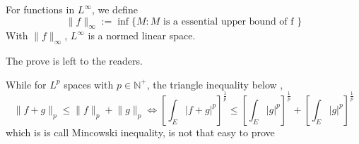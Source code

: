 \documentclass[lang=en, 12pt]{elegantbook}
\newcommand{\NN}{\mathbb{N}}
\begin{document}
        \begin{proposition}
            For functions in $L^{\infty}$, we define 
            \begin{equation}\label{NormOfLInftySpace}
                \lVert f \rVert_{\infty} := \inf \{M : M \mbox{ is a essential upper bound of f } \}
            \end{equation}
            With $\lVert f \rVert_{\infty}$, $L^{\infty}$ is a normed linear space.
        \end{proposition}
        The prove is left to the readers. \par While for $L^p$ spaces with $p \in \NN^+$,
    the triangle inequality below ,
    $$\lVert f + g \rVert_p \leq \lVert f \rVert_p +\lVert g \rVert_p
    \Leftrightarrow \left[\int_E |f +g|^p \right]^{\frac{1}{p}} \leq 
    \left[\int_E |g|^p \right]^{\frac{1}{p}}+\left[\int_E |g|^p \right]^{\frac{1}{p}}$$
    which is is call Mincowski inequality, is not that easy to prove 
    $$$$
\end{document}
